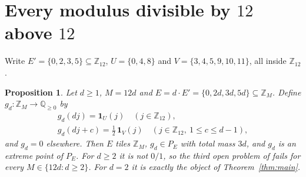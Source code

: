 \documentclass[11pt]{amsart}
\newtheorem{proposition}[theorem]{Proposition}
\theoremstyle{definition}
\theoremstyle{remark}
\newcommand{\ZM}{\mathbb Z_M}
\newcommand{\Zn}[1]{\mathbb Z_{#1}}
\newcommand{\one}{\mathbf 1}
\begin{document}
\section{Every modulus divisible by $12$ above $12$}

Write $E'=\{0,2,3,5\}\subseteq\Zn{12}$, $U=\{0,4,8\}$ and
$V=\{3,4,5,9,10,11\}$, all inside $\Zn{12}$.

\begin{proposition}\label{prop:family}
Let $d\ge1$, $M=12d$ and $E=d\cdot E'=\{0,2d,3d,5d\}\subseteq\ZM$. Define
$g_d\colon\ZM\to\mathbb Q_{\ge0}$ by
\begin{gather*}
  g_d(dj)=\one_U(j)\quad(j\in\Zn{12}),\\
  g_d(dj+c)=\tfrac12\,\one_V(j)\quad(j\in\Zn{12},\ 1\le c\le d-1),
\end{gather*}
and $g_d=0$ elsewhere. Then $E$ tiles $\ZM$, $g_d\in P_E$ with total mass $3d$,
and $g_d$ is an extreme point of $P_E$. For $d\ge2$ it is not $0/1$, so the
third open problem of \cite{KF} fails for every $M\in\{12d : d\ge2\}$. For
$d=2$ it is exactly the object of Theorem~\ref{thm:main}.
\end{proposition}
\end{document}
